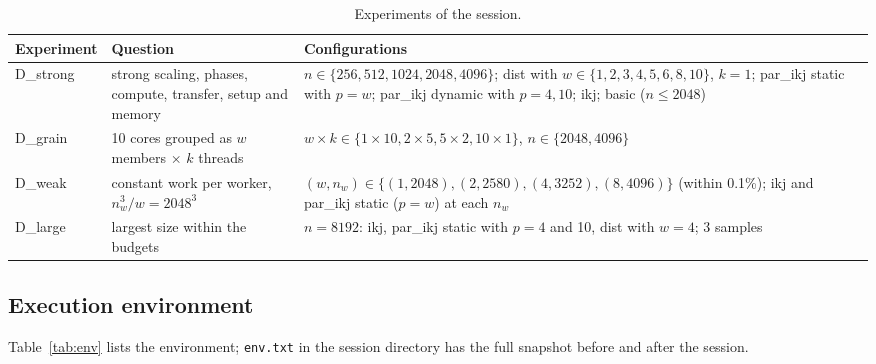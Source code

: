 \documentclass[11pt,a4paper]{article}
\begin{document}
\begin{table}[htbp]
\centering\small
\caption{Experiments of the session.}
\label{tab:experiments}
\begin{tabular}{>{\raggedright}p{1.9cm}>{\raggedright}p{6.1cm}>{\raggedright\arraybackslash}p{6.2cm}}
\toprule
Experiment & Question & Configurations \\
\midrule
D\_strong & strong scaling, phases, compute, transfer, setup and memory & $n\in\{256,512,1024,\allowbreak 2048,4096\}$; dist with $w\in\{1,2,3,4,5,6,8,10\}$, $k=1$; par\_ikj static with $p=w$; par\_ikj dynamic with $p=4,10$; ikj; basic ($n\le2048$) \\
D\_grain & 10 cores grouped as $w$ members $\times$ $k$ threads & $w\times k\in\{1\times10, 2\times5, 5\times2, 10\times1\}$, $n\in\{2048,4096\}$ \\
D\_weak & constant work per worker, $n_w^3/w=2048^3$ & $(w,n_w)\in\{(1,2048),(2,2580),(4,3252),(8,4096)\}$ (within 0.1\%); ikj and par\_ikj static ($p=w$) at each $n_w$ \\
D\_large & largest size within the budgets & $n=8192$: ikj, par\_ikj static with $p=4$ and 10, dist with $w=4$; 3 samples \\
\bottomrule
\end{tabular}
\end{table}

\subsection{Execution environment}
\label{sec:env}

Table~\ref{tab:env} lists the environment; \texttt{env.txt} in the session
directory has the full snapshot before and after the session.
\end{document}
